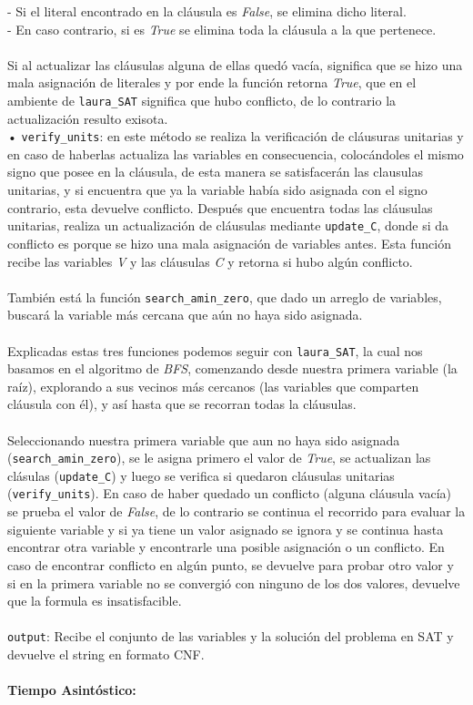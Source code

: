 \documentclass[letterpaper,12pt]{article}
\begin{document}
    - Si el literal encontrado en la cláusula es \textit{False}, se elimina dicho literal.\\
    
    - En caso contrario, si es \textit{True} se elimina toda la cláusula a la que pertenece.\\
\\
Si al actualizar las cláusulas alguna de ellas quedó vacía, significa que se hizo una mala asignación de literales y por ende la función retorna \textit{True}, que en el ambiente de \texttt{laura\_SAT} significa que hubo conflicto, de lo contrario la actualización resulto exisota.\\

• \texttt{verify\_units}: en este método se realiza la verificación de cláusuras unitarias y en caso de haberlas actualiza las variables en consecuencia, colocándoles el mismo signo que posee en la cláusula, de esta manera se satisfacerán las clausulas unitarias, y si encuentra que ya la variable había sido asignada con el signo contrario, esta devuelve conflicto. Después que encuentra todas las cláusulas unitarias, realiza un actualización de cláusulas mediante \texttt{update\_C}, donde si da conflicto es porque se hizo una mala asignación de variables antes. Esta función recibe las variables \textit{V} y las cláusulas \textit{C} y retorna si hubo algún conflicto.\\
\\
También está la función \texttt{search\_amin\_zero}, que dado un arreglo de variables, buscará la variable más cercana que aún no haya sido asignada.\\
\\
Explicadas estas tres funciones podemos seguir con \texttt{laura\_SAT}, la cual nos basamos en el algoritmo de \textit{BFS}, comenzando desde nuestra primera variable (la raíz), explorando a sus vecinos más cercanos (las variables que comparten cláusula con él), y así hasta que se recorran todas la cláusulas.\\
\\
Seleccionando nuestra primera variable que aun no haya sido asignada (\texttt{search\_amin\_zero}), se le asigna primero el valor de \textit{True}, se actualizan las clásulas (\texttt{update\_C}) y luego se verifica si quedaron cláusulas unitarias (\texttt{verify\_units}). En caso de haber quedado un conflicto (alguna cláusula vacía) se prueba el valor de \textit{False}, de lo contrario se continua el recorrido para evaluar la siguiente variable y si ya tiene un valor asignado se ignora y se continua hasta encontrar otra variable y encontrarle una posible asignación o un conflicto. En caso de encontrar conflicto en algún punto, se devuelve para probar otro valor y si en la primera variable no se convergió con ninguno de los dos valores, devuelve que la formula es insatisfacible. \\
\\
\texttt{output}: Recibe el conjunto de las variables y la solución del problema en SAT y devuelve el string en formato CNF.\\
\\
\textbf{Tiempo Asintóstico:}\\
\end{document}
